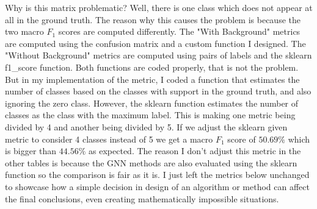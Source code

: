 \noindent Why is this matrix problematic? Well, there is one class which does not appear at all in the ground truth. The reason why this causes the problem is because the two macro $F_1$ scores are computed differently. The "With Background" metrics are computed using the confusion matrix and a custom function I designed. The "Without Background" metrics are computed using pairs of labels and the sklearn f1\_score function. Both functions are coded properly, that is not the problem. But in my implementation of the metric, I coded a function that estimates the number of classes based on the classes with support in the ground truth, and also ignoring the zero class. However, the sklearn function estimates the number of classes as the class with the maximum label. This is making one metric being divided by 4 and another being divided by 5. If we adjust the sklearn given metric to consider 4 classes instead of 5 we get a macro $F_1$ score of $50.69\%$ which is bigger than $44.56\%$ as expected. The reason I don't adjust this metric in the other tables is because the GNN methods are also evaluated using the sklearn function so the comparison is fair as it is. I just left the metrics below unchanged to showcase how a simple decision in design of an algorithm or method can affect the final conclusions, even creating mathematically impossible situations.

